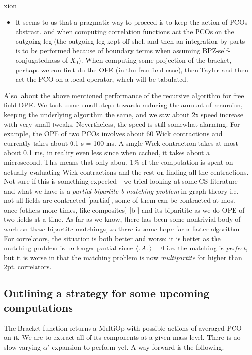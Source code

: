 xion\documentclass[12pt]{article}
\numberwithin{equation}{section}
\begin{document}
\begin{itemize}
\item It seems to us that a pragmatic way to proceed is to keep the action of PCOs abstract, and when computing correlation functions act the PCOs on the outgoing leg (the outgoing leg kept off-shell and then an integration by parts is to be performed because of boundary terms when assuming BPZ-self-conjugatedness of $X_0$). When computing some projection of the bracket, perhaps we can first do the OPE (in the free-field case), then Taylor and then act the PCO on a local operator, which will be tabulated.
\end{itemize}
Also, about the above mentioned performance of the recursive algorithm for free field OPE. We took some small steps towards reducing the amount of recursion, keeping the underlying algorithm the same, and we saw about 2x speed increase with very small tweaks. Nevertheless, the speed is still somewhat alarming. For example, the OPE of two PCOs involves about 60 Wick contractions and currently takes about 0.1 s = 100 ms. A single Wick contraction takes at most about 0.1 ms, in reality even less since when cached, it takes about a microsecond. This means that only about $1\%$ of the computation is spent on actually evaluating Wick contractions and the rest on finding all the contractions. Not sure if this is something expected - we tried looking at some CS literature and what we have is a \textit{partial bipartite b-matching problem} in graph theory i.e. not all fields are contracted [partial], some of them can be contracted at most once (others more times, like composites) [b-] and its biparitite as we do OPE of two fields at a time. As far as we know, there has been some nontrivial body of work on these bipartite matchings, so there is some hope for a faster algorithm. For correlators, the situation is both better and worse: it is better as the matching problem is no longer partial since $\langle :A:\rangle = 0$ i.e. the matching is \textit{perfect}, but it is worse in that the matching problem is now \textit{multipartite} for higher than 2pt. correlators.

\subsection{Outlining a strategy for some upcoming computations}
The Bracket function returns a MultiOp with possible actions of averaged PCO on it. We are to extract all of its components at a given mass level. There is no slow-varying $\alpha'$ expansion to perform yet. A way forward is the following.
\end{document}
